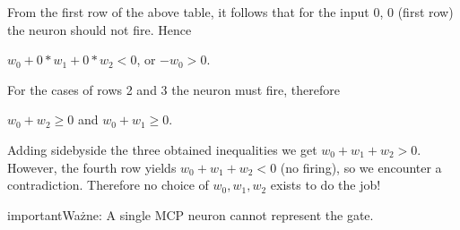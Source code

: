 \documentclass[a4paper,12pt,polish]{jupyterBook}
\begin{document}
\sphinxAtStartPar
From the first row of the above table, it follows that for the input 0, 0 (first row) the neuron should not fire. Hence

\sphinxAtStartPar
\(w_0  + 0* w_1 + 0*w_2  < 0\), or \(-w_0>0\).

\sphinxAtStartPar
For the cases of rows 2 and 3 the neuron must fire, therefore

\sphinxAtStartPar
\(w_0+w_2 \ge 0\) and \(w_0+w_1 \ge 0\).

\sphinxAtStartPar
Adding side\sphinxhyphen{}by\sphinxhyphen{}side the three obtained inequalities we get \(w_0+w_1+w_2 > 0\). However, the fourth row yields
\(w_0+w_1+w_2<0\) (no firing), so we encounter a contradiction. Therefore no choice of \(w_0, w_1, w_2\) exists to do the job!

\begin{sphinxadmonition}{important}{Ważne:}
\sphinxAtStartPar
A single MCP neuron cannot represent the  gate.
\end{sphinxadmonition}
\end{document}
